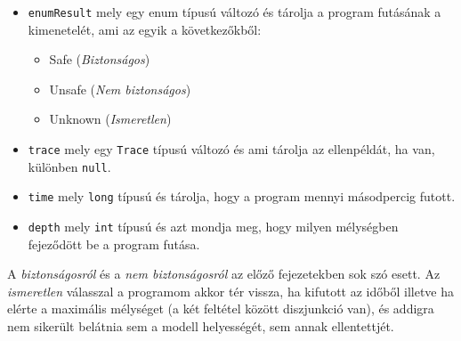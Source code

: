 \begin{itemize}
	\item \verb+enumResult+ mely egy enum típusú változó és tárolja a program futásának a kimenetelét, ami az egyik a következőkből:
	\begin{itemize}
		\item Safe (\emph{Biztonságos})
		\item Unsafe (\emph{Nem biztonságos})
		\item Unknown (\emph{Ismeretlen})
	\end{itemize}
	\item \verb+trace+ mely egy \verb+Trace+ típusú változó és ami tárolja az ellenpéldát, ha van, különben \verb+null+.
	\item \verb+time+ mely \verb+long+ típusú és tárolja, hogy a program mennyi másodpercig futott.
	\item \verb+depth+ mely \verb+int+ típusú és azt mondja meg, hogy milyen mélységben fejeződött be a program futása.
\end{itemize}

A \textit{biztonságosról} és a \textit{nem biztonságosról} az előző fejezetekben sok szó esett. Az \textit{ismeretlen} válasszal a programom akkor tér vissza, ha kifutott az időből illetve ha elérte a maximális mélységet (a két feltétel között diszjunkció van), és addigra nem sikerült belátnia sem a modell helyességét, sem annak ellentettjét.









